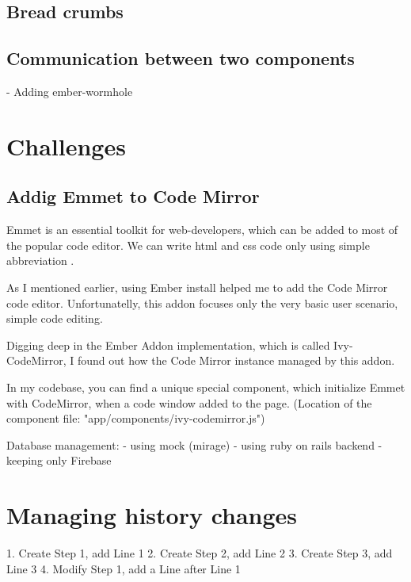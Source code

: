 \documentclass[12pt, a4paper, oneside, openright, medskipamount]{report}
\begin{document}
\subsection{Bread crumbs}





\subsection{Communication between two components}

- Adding ember-wormhole

\section{Challenges}

\subsection{Addig Emmet to Code Mirror}

Emmet is an essential toolkit for web-developers, which can be added to most of the popular code editor. We can write html and css code only using simple abbreviation \cite{emmet}.

As I mentioned earlier, using Ember install helped me to add the Code Mirror code editor. Unfortunatelly, this addon focuses only the very basic user scenario, simple code editing.

Digging deep in the Ember Addon implementation, which is called Ivy-CodeMirror\cite{ivy-codemirror}, I found out how the Code Mirror instance managed by this addon.

In my codebase, you can find a unique special component, which initialize Emmet with CodeMirror, when a code window added to the page. (Location of the component file: "app/components/ivy-codemirror.js")





Database management:
- using mock (mirage)
- using ruby on rails backend
- keeping only Firebase


\section{Managing history changes}

1. Create Step 1, add Line 1
2. Create Step 2, add Line 2
3. Create Step 3, add Line 3
4. Modify Step 1, add a Line after Line 1
\end{document}
